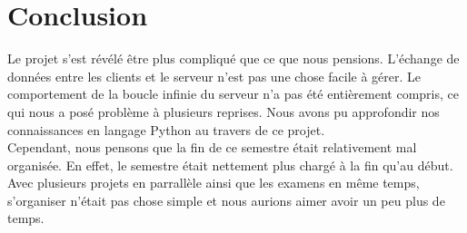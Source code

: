 \documentclass[11pt]{report}
\begin{document}

\section{Conclusion}
Le projet s'est révélé être plus compliqué que ce que nous pensions.
L'échange de données entre les clients et le serveur n'est pas une chose
facile à gérer. Le comportement de la boucle infinie du serveur n'a pas été
entièrement compris, ce qui nous a posé problème à plusieurs reprises.
Nous avons pu approfondir nos connaissances en langage Python au travers
de ce projet. \\
Cependant, nous pensons que la fin de ce semestre était relativement mal organisée.
En effet, le semestre était nettement plus chargé à la fin qu'au début.
Avec plusieurs projets en parrallèle ainsi que les examens en même temps,
s'organiser n'était pas chose simple et nous aurions aimer avoir un peu plus de
temps.
\end{document}
